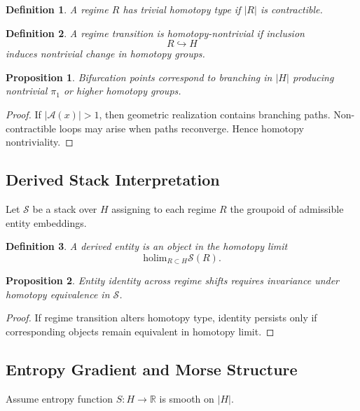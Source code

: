 \documentclass[12pt]{article}
\newtheorem{proposition}{Proposition}
\newtheorem{definition}{Definition}
\begin{document}
\begin{definition}
A regime $R$ has trivial homotopy type if $|R|$ is contractible.
\end{definition}

\begin{definition}
A regime transition is homotopy-nontrivial if inclusion
\[
R \hookrightarrow H
\]
induces nontrivial change in homotopy groups.
\end{definition}

\begin{proposition}
Bifurcation points correspond to branching in $|H|$ producing nontrivial $\pi_1$ or higher homotopy groups.
\end{proposition}

\begin{proof}
If $|\mathcal{A}(x)| > 1$, then geometric realization contains branching paths. Non-contractible loops may arise when paths reconverge. Hence homotopy nontriviality.
\end{proof}

\subsection{Derived Stack Interpretation}

Let $\mathcal{S}$ be a stack over $H$ assigning to each regime $R$ the groupoid of admissible entity embeddings.

\begin{definition}
A derived entity is an object in the homotopy limit
\[
\mathrm{holim}_{R \subset H} \mathcal{S}(R).
\]
\end{definition}

\begin{proposition}
Entity identity across regime shifts requires invariance under homotopy equivalence in $\mathcal{S}$.
\end{proposition}

\begin{proof}
If regime transition alters homotopy type, identity persists only if corresponding objects remain equivalent in homotopy limit.
\end{proof}

\subsection{Entropy Gradient and Morse Structure}

Assume entropy function $S : H \to \mathbb{R}$ is smooth on $|H|$.
\end{document}
